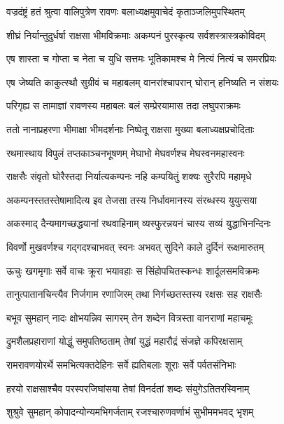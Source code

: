 
\twolineshloka
{वज्रदंष्ट्रं हतं श्रुत्वा वालिपुत्रेण रावणः}
{बलाध्यक्षमुवाचेदं कृताञ्जलिमुपस्थितम्} %

\twolineshloka
{शीघ्रं निर्यान्तुदुर्धर्षा राक्षसा भीमविक्रमाः}
{अकम्पनं पुरस्कृत्य सर्वशस्त्रास्त्रकोविदम्} %

\twolineshloka
{एष शास्ता च गोप्ता च नेता च युधि सत्तमः}
{भूतिकामश्च मे नित्यं नित्यं च समरप्रियः} %

\twolineshloka
{एष जेष्यति काकुत्स्थौ सुग्रीवं च महाबलम्}
{वानरांश्चापरान् घोरान् हनिष्यति न संशयः} %

\twolineshloka
{परिगृह्य स तामाज्ञां रावणस्य महाबलः}
{बलं सम्प्रेरयामास तदा लघुपराक्रमः} %

\twolineshloka
{ततो नानाप्रहरणा भीमाक्षा भीमदर्शनाः}
{निष्पेतू राक्षसा मुख्या बलाध्यक्षप्रचोदिताः} %

\twolineshloka
{रथमास्थाय विपुलं तप्तकाञ्चनभूषणम्}
{मेघाभो मेघवर्णश्च मेघस्वनमहास्वनः} %

\twolineshloka
{राक्षसैः संवृतो घोरैस्तदा निर्यात्यकम्पनः}
{नहि कम्पयितुं शक्यः सुरैरपि महामृधे} %

\twolineshloka
{अकम्पनस्ततस्तेषामादित्य इव तेजसा}
{तस्य निर्धावमानस्य संरब्धस्य युयुत्सया} %

\twolineshloka
{अकस्माद् दैन्यमागच्छद्धयानां रथवाहिनाम्}
{व्यस्फुरन्नयनं चास्य सव्यं युद्धाभिनन्दिनः} %

\twolineshloka
{विवर्णो मुखवर्णश्च गद्गदश्चाभवत् स्वनः}
{अभवत् सुदिने काले दुर्दिनं रूक्षमारुतम्} %

\twolineshloka
{ऊचुः खगमृगाः सर्वे वाचः क्रूरा भयावहाः}
{स सिंहोपचितस्कन्धः शार्दूलसमविक्रमः} %

\twolineshloka
{तानुत्पातानचिन्त्यैव निर्जगाम रणाजिरम्}
{तथा निर्गच्छतस्तस्य रक्षसः सह राक्षसैः} %

\twolineshloka
{बभूव सुमहान् नादः क्षोभयन्निव सागरम्}
{तेन शब्देन वित्रस्ता वानराणां महाचमूः} %

\twolineshloka
{द्रुमशैलप्रहाराणां योद्धुं समुपतिष्ठताम्}
{तेषां युद्धं महारौद्रं संजज्ञे कपिरक्षसाम्} %

\twolineshloka
{रामरावणयोरर्थे समभित्यक्तदेहिनः}
{सर्वे ह्यतिबलाः शूराः सर्वे पर्वतसंनिभाः} %

\twolineshloka
{हरयो राक्षसाश्चैव परस्परजिघांसया}
{तेषां विनर्दतां शब्दः संयुगेऽतितरस्विनाम्} %

\twolineshloka
{शुश्रुवे सुमहान् कोपादन्योन्यमभिगर्जताम्}
{रजश्चारुणवर्णाभं सुभीममभवद् भृशम्} %

